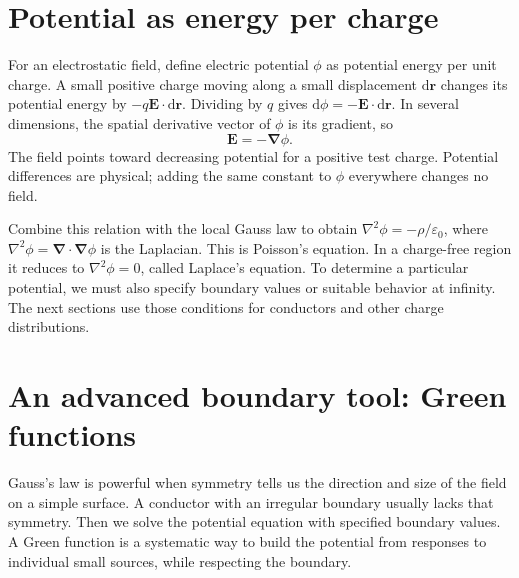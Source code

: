 \documentclass[11pt,oneside]{book}
\newcommand{\dd}{\mathrm{d}}
\newcommand{\vect}[1]{\boldsymbol{#1}}
\newcommand{\grad}{\boldsymbol{\nabla}}
\newcommand{\lap}{\nabla^2}
\newcommand{\eps}{\varepsilon_0}
\theoremstyle{reviewstyle}
\begin{document}
\section{Potential as energy per charge}
For an electrostatic field, define electric potential $\phi$ as potential energy per unit charge. A small positive charge moving along a small displacement $\dd\vect r$ changes its potential energy by $-q\vect E\cdot\dd\vect r$. Dividing by $q$ gives $\dd\phi=-\vect E\cdot\dd\vect r$. In several dimensions, the spatial derivative vector of $\phi$ is its gradient, so
\begin{equation}
\vect E=-\grad\phi.
\end{equation}
The field points toward decreasing potential for a positive test charge. Potential differences are physical; adding the same constant to $\phi$ everywhere changes no field.

Combine this relation with the local Gauss law to obtain $\lap\phi=-\rho/\eps$, where $\lap\phi=\grad\cdot\grad\phi$ is the Laplacian. This is Poisson's equation. In a charge-free region it reduces to $\lap\phi=0$, called Laplace's equation. To determine a particular potential, we must also specify boundary values or suitable behavior at infinity. The next sections use those conditions for conductors and other charge distributions.

\section{An advanced boundary tool: Green functions}
Gauss's law is powerful when symmetry tells us the direction and size of the field on a simple surface. A conductor with an irregular boundary usually lacks that symmetry. Then we solve the potential equation with specified boundary values. A Green function is a systematic way to build the potential from responses to individual small sources, while respecting the boundary.
\end{document}
